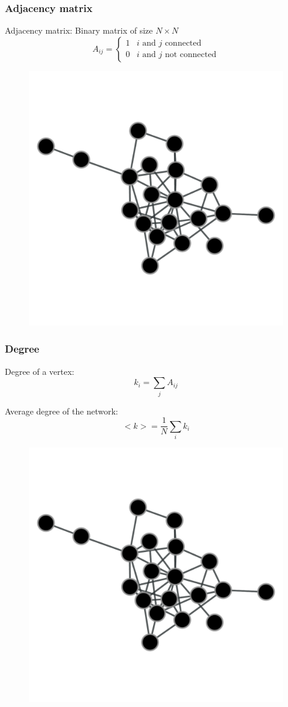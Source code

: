 \documentclass{beamer}
\begin{document}
\begin{frame}
    \frametitle{Adjacency matrix}
\vspace{20pt}
\footnotesize
Adjacency matrix: Binary matrix of size $N \times N$
\begin{equation*}
A_{ij} = \begin{cases}
1 & \text{$i$ and $j$ connected}\\
0 & \text{$i$ and $j$ not connected}
\end{cases}
\end{equation*}
\vspace{10pt}

\begin{figure}
\includegraphics[width=0.5\columnwidth, trim = 0 0 0 100]{network.pdf}
\end{figure}
\end{frame}
\begin{frame}
    \frametitle{Degree}
    Degree of a vertex: 
    \begin{equation*}
    k_i = \sum\limits_{j}A_{ij} 
    \end{equation*}

    Average degree of the network: 
    $$<k> = \frac{1}{N}\sum\limits_{i}k_i$$
\begin{figure}
\includegraphics[width=0.5\columnwidth, trim = 0 0 0 100]{network.pdf}
\end{figure}
\end{frame}
\end{document}
